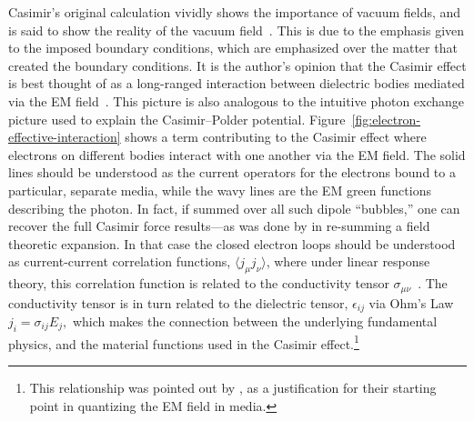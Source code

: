 Casimir's original calculation vividly shows the importance of vacuum fields, and is said to show the reality 
of the vacuum field~\citep{Jaffe2005}.  This is due to the emphasis given to the imposed boundary conditions,
which are emphasized over the matter that created the boundary conditions.  
It is the author's opinion that the Casimir effect is best thought of as a long-ranged interaction between dielectric bodies 
mediated via the EM field~\citep{Jaffe2005, Rahi2009}.  This picture is also
analogous to the intuitive photon exchange picture used to explain the Casimir--Polder potential.
  Figure~\ref{fig:electron-effective-interaction} shows a term contributing to the Casimir effect where 
electrons on different bodies interact with one another via the EM field.
  The solid lines should
be understood as the current operators for the electrons bound to a particular, separate media, while the 
wavy lines are the EM green functions describing the photon.  In fact, if summed over all such dipole ``bubbles,''
one can recover the full Casimir force results---as was done by \citet{Dzyaloshinskii1961} in re-summing a field 
theoretic expansion.  
In that case the closed electron loops should be understood as current-current correlation functions,
$\langle j_\mu j_\nu\rangle$, where under linear response theory, this correlation function is related to the conductivity
tensor $\sigma_{\mu\nu}$~\citep{Kubo1957,Altland2011}.  The conductivity tensor is in turn related to the dielectric tensor, $\epsilon_{ij}$
via Ohm's Law $j_i=\sigma_{ij}E_j,$ which makes the connection between the underlying fundamental physics,
and the material functions used in the Casimir effect.\footnote{
  This relationship was pointed out by \citet{Rahi2009}, as a justification for their starting point
  in quantizing the EM field in media.}



